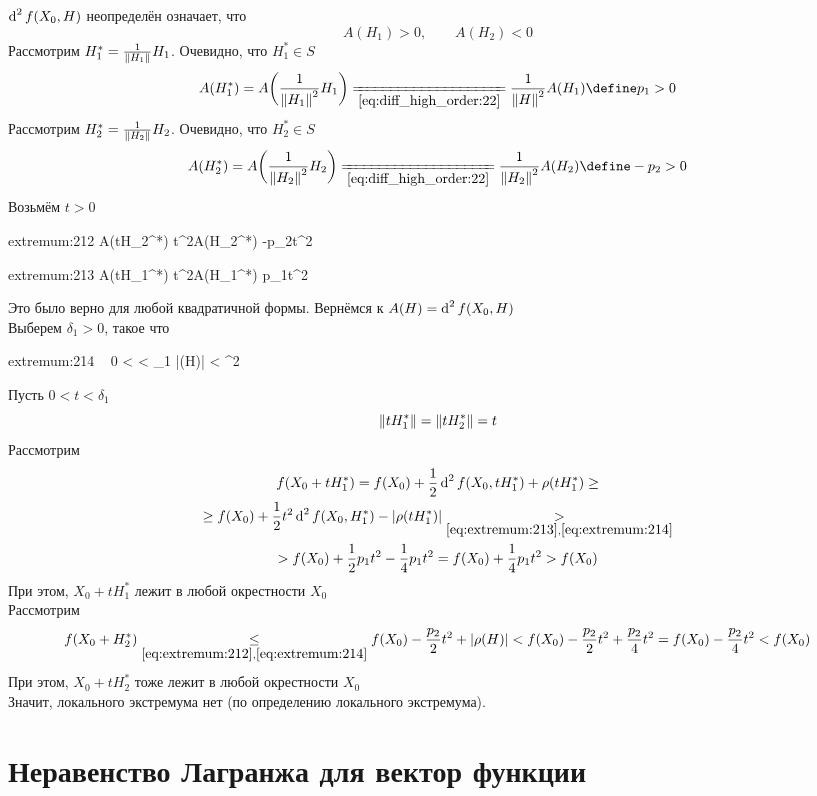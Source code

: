 \begin{eproof}
	\item $ \di[2] f(X_0, H) $ неопределён означает, что
	$$ A(H_1) > 0, \qquad A(H_2) < 0 $$
	Рассмотрим $ H_1^* = \frac1{\norm{H_1}}H_1 $. Очевидно, что $ H_1^* \in S $
	$$ A(H_1^*) = A \bigg( \frac1{\norm{H_1}^2}H_1 \bigg) \undereq{\eref{diff_high_order:22}} \frac1{\norm{H}^2}A(H_1) \define p_1 > 0 $$
	Рассмотрим $ H_2^* = \frac1{\norm{H_2}}H_2 $. Очевидно, что $ H_2^* \in S $
	$$ A(H_2^*) = A \bigg( \frac1{\norm{H_2}^2}H_2 \bigg) \undereq{\eref{diff_high_order:22}} \frac1{\norm{H_2}^2}A(H_2) \define -p_2 > 0 $$
	Возьмём $ t > 0 $
	\begin{equ}{extremum:212}
		A(tH_2^*)  t^2A(H_2^*)  -p_2t^2
	\end{equ}
	\begin{equ}{extremum:213}
		A(tH_1^*)  t^2A(H_1^*)  p_1t^2
	\end{equ}
	Это было верно для любой квадратичной формы. Вернёмся к $ A(H) = \di[2] f(X_0, H) $ \\
	Выберем $ \delta_1 > 0 $, такое что
	\begin{equ}{extremum:214}
		\forall ~ 0 <  < \delta_1 \quad |\rho(H)| <  \min{} \cdot {}^2
	\end{equ}
	Пусть $ 0 < t < \delta_1 $
	$$ \norm{tH_1^*} = \norm{tH_2^*} = t $$
	Рассмотрим
	\begin{multline*}
		f(X_0 + tH_1^*) = f(X_0) + \half \di[2] f(X_0, tH_1^*) + \rho(tH_1^*) \ge \\
		\ge f(X_0) + \half t^2 \di[2] f(X_0, H_1^*) - |\rho(tH_1^*)| \underset{\eref{extremum:213}, \eref{extremum:214}}> \\
		> f(X_0) + \half p_1t^2 - \frac14 p_1t^2 = f(X_0) + \frac14 p_1t^2 > f(X_0)
	\end{multline*}
	При этом, $ X_0 + tH_1^* $ лежит в любой окрестности $ X_0 $ \\
	Рассмотрим
	$$ f(X_0 + H_2^*) \underset{\eref{extremum:212}, \eref{extremum:214}}\le f(X_0) - \half[p_2]t^2 + |\rho(H)| < f(X_0) - \half[p_2]t^2 + \frac{p_2}4t^2 = f(X_0) - \frac{p_2}4t^2 < f(X_0) $$
	При этом, $ X_0 + tH_2^* $ тоже лежит в любой окрестности $ X_0 $ \\
	Значит, локального экстремума нет (по определению локального экстремума).
\end{eproof}

\section{Неравенство Лагранжа для вектор функции}

